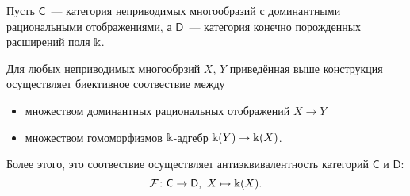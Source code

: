    Пусть $\mathsf{C}$~--- категория неприводимых многообразий с доминантными рациональными отображениями, а $\mathsf{D}$~--- категория конечно порожденных расширений поля $\Bbbk$.

	 \begin{theorem}\label{antieq_cat_2}
	 	Для любых неприводимых многообрзий $X$, $Y$ приведённая выше конструкция осуществляет биективное соотвествие между 
	 	\begin{itemize}
	 		\item множеством доминантных рациональных отображений $X \to Y$
	 		\item множеством гомоморфизмов $\Bbbk$-адгебр $\Bbbk(Y) \to \Bbbk(X)$.
	 	\end{itemize}

	 	Более этого, это соотвествие осуществляет антиэквивалентность категорий $\mathsf{C}$ и $\mathsf{D}$: 
	 	\[
	 		\mathcal{F}\colon \mathsf{C} \to \mathsf{D}, \ X \mapsto \Bbbk(X).
	 	\]
	 \end{theorem}
